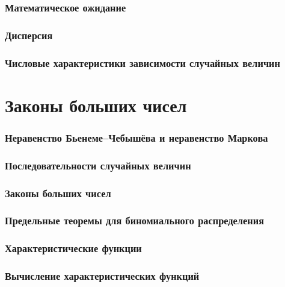 \documentclass[a4paper,14pt]{extarticle}
\theoremstyle{definition}
\theoremstyle{definition}
\theoremstyle{remark}
\begin{document}
\section{Математическое ожидание} 

\section{Дисперсия} 

\section{Числовые характеристики зависимости
случайных величин} 

\part{Законы больших чисел}

\section{Неравенство Бьенеме–Чебышёва и
неравенство Маркова}

\section{Последовательности случайных величин}


\section{Законы больших чисел} 

\section{Предельные теоремы для
биномиального распределения} 

\section{Характеристические функции}

\section{Вычисление характеристических
функций}
\end{document}
